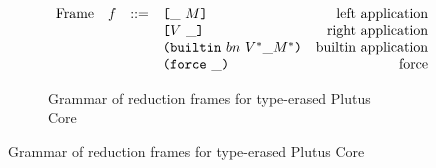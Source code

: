 \documentclass[../plutus-core-specification.tex]{subfiles}
\begin{document}

\begin{figure}[H]
\begin{subfigure}[c]{\linewidth}
    \centering
    \[\begin{array}{lrclr}
        \textrm{Frame} & f  & ::=   & \texttt{[} \_ ~ M \texttt{]}          & \textrm{left application}\\
                       &   &     & \texttt{[} V ~ \_ \texttt{]}            & \textrm{right application}\\
                       &   &     & \texttt{(} \texttt{builtin} ~ bn ~ V^* \_ M^* \texttt{)}   & \textrm{builtin application}\\
                       &   &     & \texttt{(} \texttt{force} ~ \_ \texttt{)}                  & \textrm{force}
    \end{array}\]
    \caption{Grammar of reduction frames for type-erased Plutus Core}
    \label{fig:untyped-reduction-frames}
\end{subfigure}
\end{figure}
\end{document}
